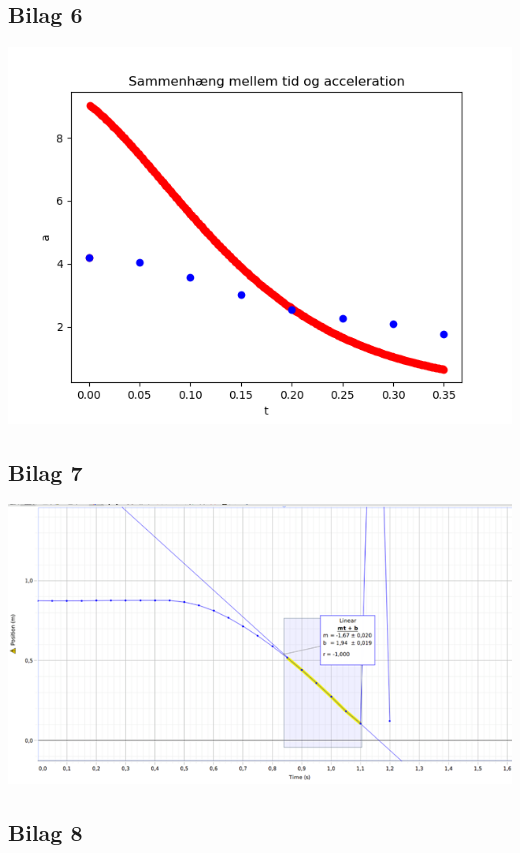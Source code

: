 \documentclass[12pt]{article}
\begin{document}
\subsection*{Bilag 6}
\begin{center}
\includegraphics[width=\linewidth]{acceleration.png}
\end{center}

\subsection*{Bilag 7}
\begin{center}
\includegraphics[width=\linewidth]{maalthastighed.png}
\end{center}

\subsection*{Bilag 8}
\begin{center}
  
\end{center}
\end{document}

